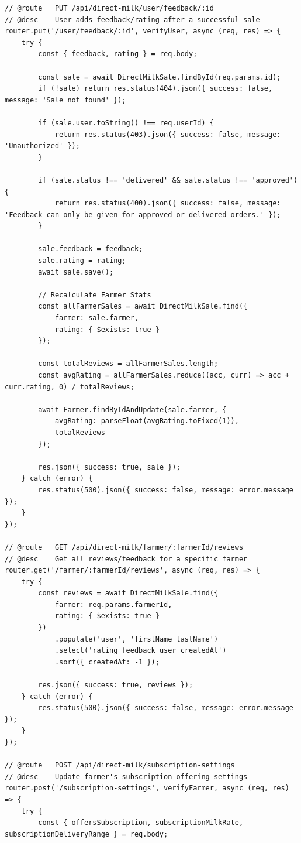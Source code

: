 \documentclass[12pt,a4paper]{report}
\begin{document}
\begin{lstlisting}
// @route   PUT /api/direct-milk/user/feedback/:id
// @desc    User adds feedback/rating after a successful sale
router.put('/user/feedback/:id', verifyUser, async (req, res) => {
    try {
        const { feedback, rating } = req.body;

        const sale = await DirectMilkSale.findById(req.params.id);
        if (!sale) return res.status(404).json({ success: false, message: 'Sale not found' });

        if (sale.user.toString() !== req.userId) {
            return res.status(403).json({ success: false, message: 'Unauthorized' });
        }

        if (sale.status !== 'delivered' && sale.status !== 'approved') {
            return res.status(400).json({ success: false, message: 'Feedback can only be given for approved or delivered orders.' });
        }

        sale.feedback = feedback;
        sale.rating = rating;
        await sale.save();

        // Recalculate Farmer Stats
        const allFarmerSales = await DirectMilkSale.find({
            farmer: sale.farmer,
            rating: { $exists: true }
        });

        const totalReviews = allFarmerSales.length;
        const avgRating = allFarmerSales.reduce((acc, curr) => acc + curr.rating, 0) / totalReviews;

        await Farmer.findByIdAndUpdate(sale.farmer, {
            avgRating: parseFloat(avgRating.toFixed(1)),
            totalReviews
        });

        res.json({ success: true, sale });
    } catch (error) {
        res.status(500).json({ success: false, message: error.message });
    }
});

// @route   GET /api/direct-milk/farmer/:farmerId/reviews
// @desc    Get all reviews/feedback for a specific farmer
router.get('/farmer/:farmerId/reviews', async (req, res) => {
    try {
        const reviews = await DirectMilkSale.find({
            farmer: req.params.farmerId,
            rating: { $exists: true }
        })
            .populate('user', 'firstName lastName')
            .select('rating feedback user createdAt')
            .sort({ createdAt: -1 });

        res.json({ success: true, reviews });
    } catch (error) {
        res.status(500).json({ success: false, message: error.message });
    }
});

// @route   POST /api/direct-milk/subscription-settings
// @desc    Update farmer's subscription offering settings
router.post('/subscription-settings', verifyFarmer, async (req, res) => {
    try {
        const { offersSubscription, subscriptionMilkRate, subscriptionDeliveryRange } = req.body;
        

\end{lstlisting}
\end{document}
